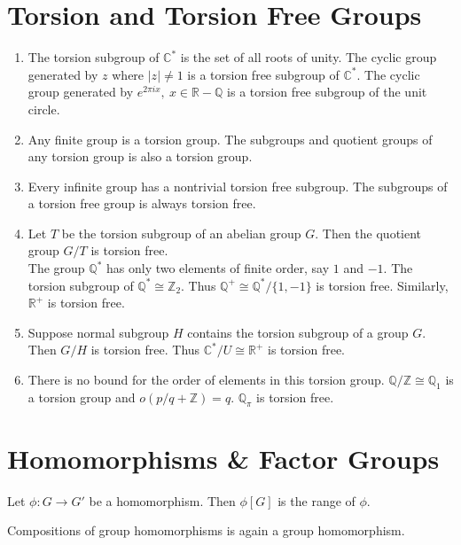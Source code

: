\section{Torsion and Torsion Free Groups}
\begin{enumerate}
	\item The torsion subgroup of $\mathbb{C}^\ast$ is the set of all roots of unity.
	The cyclic group generated by $z$ where $|z| \ne 1$ is a torsion free subgroup of $\mathbb{C}^\ast$.
	The cyclic group generated by $e^{2 \pi i x},\ x \in \mathbb{R}-\mathbb{Q}$ is a torsion free subgroup of the unit circle.
	\item Any finite group is a torsion group. The subgroups and quotient groups of any torsion group is also a torsion group. 
	\item Every infinite group has a nontrivial torsion free subgroup. The subgroups of a torsion free group is always torsion free.
	\item Let $T$ be the torsion subgroup of an abelian group $G$. Then the quotient group $G/T$ is torsion free.\\

	The group $\mathbb{Q}^\ast$ has only two elements of finite order, say $1$ and $-1$.
	The torsion subgroup of $\mathbb{Q}^\ast \cong \mathbb{Z}_2$.
	Thus $\mathbb{Q}^+ \cong \mathbb{Q}^\ast / \{ 1,-1 \}$ is torsion free.
	Similarly, $\mathbb{R}^+$ is torsion free.
	\item Suppose normal subgroup $H$ contains the torsion subgroup of a group $G$. Then $G/H$ is torsion free.
	Thus $\mathbb{C}^\ast/U \cong \mathbb{R}^+$ is torsion free.
	\item There is no bound for the order of elements in this torsion group.
		\subitem $\mathbb{Q}/\mathbb{Z} \cong \mathbb{Q}_1$ is a torsion group and $o(p/q+\mathbb{Z}) = q$.
		\subitem $\mathbb{Q}_\pi$ is torsion free.
\end{enumerate}

\section{Homomorphisms \& Factor Groups}
\begin{definition}
	Let $\phi : G \to G'$ be a homomorphism.
	Then $\phi[G]$ is the range of $\phi$.
\end{definition}
	Compositions of group homomorphisms is again a group homomorphism.

